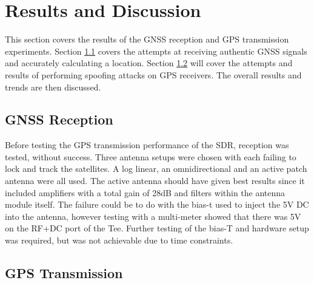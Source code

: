 
\chapter{Results and Discussion} %

\label{Chapter5} %

This section covers the results of the GNSS reception and GPS transmission experiments. Section \ref{sec:Res_GNSSReception} covers the attempts at receiving authentic GNSS
signals and accurately calculating a location. Section \ref{sec:Res_GPSTransmission} will cover the attempts and results of performing spoofing attacks on GPS receivers.
The overall results and trends are then discussed.

\section{GNSS Reception} \label{sec:Res_GNSSReception}
Before testing the GPS transmission performance of the SDR, reception was tested, without success. Three antenna setups were chosen with each failing to lock and track the
satellites. A log linear, an omnidirectional and an active patch antenna were all used. The active antenna should have given best results since it included amplifiers
with a total gain of 28dB and
filters within the antenna module itself. The failure could be to do with the bias-t used to inject the 5V DC into the antenna, however testing with a multi-meter showed
that there was 5V on the RF+DC port of the Tee. Further testing of the bias-T and hardware setup was required, but was not achievable due to time constraints.


\section{GPS Transmission} \label{sec:Res_GPSTransmission}

